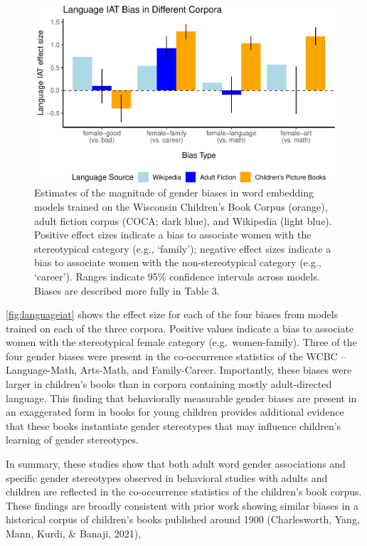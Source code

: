 \documentclass[
  english,
  ,man,floatsintext]{apa6}
\begin{document}
\begin{figure}[t!]
\includegraphics[width=\textwidth,]{figs/fig5.pdf} \caption{Estimates of the magnitude of gender biases in word embedding models trained on the Wisconsin Children’s Book Corpus (orange), adult fiction corpus (COCA; dark blue), and Wikipedia (light blue). Positive effect sizes indicate a bias to associate women with the stereotypical category (e.g., ‘family'); negative effect sizes indicate a bias to associate women with the non-stereotypical category (e.g., ‘career’).  Ranges indicate 95\% confidence intervals across models. Biases are described more fully in Table 3.}\label{fig:languageiat}
\end{figure}

\autoref{fig:languageiat} shows the effect size for each of the four biases from models trained on each of the three corpora. Positive values indicate a bias to associate women with the stereotypical female category (e.g.~women-family). Three of the four gender biases were present in the co-occurrence statistics of the WCBC -- Language-Math, Arts-Math, and Family-Career. Importantly, these biases were larger in children's books than in corpora containing mostly adult-directed language. This finding that behaviorally measurable gender biases are present in an exaggerated form in books for young children provides additional evidence that these books instantiate gender stereotypes that may influence children's learning of gender stereotypes.

In summary, these studies show that both adult word gender associations and specific gender stereotypes observed in behavioral studies with adults and children are reflected in the co-occurrence statistics of the children's book corpus. These findings are broadly consistent with prior work showing similar biases in a historical corpus of children's books published around 1900 (Charlesworth, Yang, Mann, Kurdi, \& Banaji, 2021),
\end{document}
